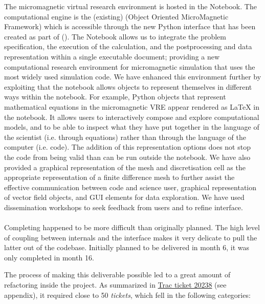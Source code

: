 \documentclass{deliverablereport}
\begin{document}
The micromagnetic virtual research environment is hosted in the \Jupyter
Notebook. The computational engine is the (existing) \OOMMF (Object Oriented
MicroMagnetic Framework) which is accessible through the new Python interface
that has been created as part of \ODK  
(). The \Jupyter Notebook allows us to
integrate the problem specification, the execution of the calculation, and the
postprocessing and data representation within a single executable document;
providing a new computational research environment for micromagnetic
simulation that uses the most widely used simulation code. We have enhanced
this environment further by exploiting that the notebook allows objects to
represent themselves in different ways within the notebook. For example,
Python objects that represent mathematical equations in the micromagnetic VRE
appear rendered as \LaTeX{} in the notebook. It allows users to interactively
compose and explore computational models, and to be able to inspect what they
have put together in the language of the scientist (i.e. through equations)
rather than through the language of the computer (i.e. code). The addition of
this representation options does not stop the code from being valid \Python
than can be run outside the notebook. We have also provided a graphical
representation of the mesh and discretisation cell as the appropriate
representation of a finite difference mesh to further assist the effective
communication between code and science user, graphical representation of
vector field objects, and GUI elements for data exploration. We have used dissemination workshops 
to seek feedback from users and to refine interface.

\paragraph{}

Completing  happened to be more difficult than
originally planned. The high level of coupling between \Sage internals
and the \Pari interface makes it very delicate to pull the latter out
of the \Sage codebase. Initially planned to be delivered in month 6,
it was only completed in month 16.

The process of making this deliverable possible led to a great amount
of refactoring inside the \Sage project. As summarized in
\href{http://trac.sagemath.org/ticket/20238}{Trac ticket 20238} (see
appendix), it required close to 50 \emph{tickets}, which fell in the
following categories:
\end{document}
